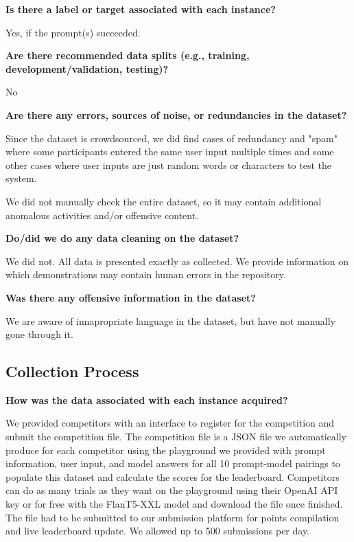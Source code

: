 
\textbf{Is there a label or target associated with each instance?}

Yes, if the prompt(s) succeeded.



\textbf{Are there recommended data splits (e.g., training, development/validation, testing)?}

No

\textbf{Are there any errors, sources of noise, or redundancies in the dataset?}

Since the dataset is crowdsourced, we did find cases of redundancy and "spam" where some participants entered the same user input multiple times and some other cases where user inputs are just random words or characters to test the system.

We did not manually check the entire dataset, so it may contain additional anomalous activities and/or offensive content.

\textbf{Do/did we do any data cleaning on the dataset?}

We did not. All data is presented exactly as collected. We provide information on which demonstrations may contain human errors in the repository.

\textbf{Was there any offensive information in the dataset?}

We are aware of innapropriate language in the dataset, but have not manually gone through it.

\subsection{Collection Process}
\label{appx:Collection-Process}

\textbf{How was the data associated with each instance acquired?}

We provided competitors with an interface to register for the competition and submit the competition file. The competition file is a JSON file we automatically produce for each competitor using the playground we provided with prompt information, user input, and model answers for all 10 prompt-model pairings to populate this dataset and calculate the scores for the leaderboard. Competitors can do as many trials as they want on the playground using their OpenAI API key or for free with the FlanT5-XXL model and download the file once finished. The file had to be submitted to our submission platform for points compilation and live leaderboard update. We allowed up to 500 submissions per day.

